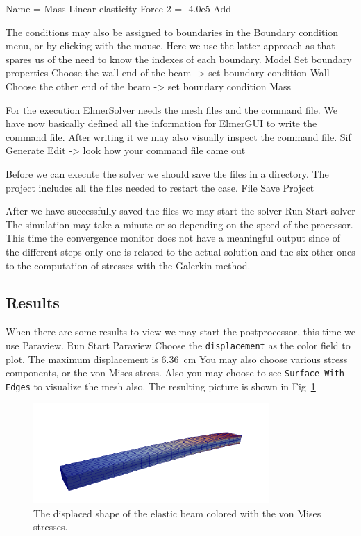     Name = Mass
    Linear elasticity 
      Force 2 = -4.0e5
    Add 
\ttend   

The conditions may also be assigned to boundaries in the Boundary condition menu, or 
by clicking with the mouse. Here we use the latter approach as that spares us of the 
need to know the indexes of each boundary. 
\ttbegin
Model
  Set boundary properties
    Choose the wall end of the beam -> set boundary condition Wall
    Choose the other end of the beam -> set boundary condition Mass
\ttend

For the execution 
ElmerSolver needs the mesh files and the command file. We have now basically defined
all the information for ElmerGUI to write the command file. After writing it we may also visually 
inspect the command file.
\ttbegin
Sif 
  Generate
  Edit -> look how your command file came out  
\ttend

Before we can execute the solver we should save the files in a directory. The project includes
all the files needed to restart the case.
\ttbegin
File 
  Save Project
\ttend

After we have successfully saved the files we may start the solver
\ttbegin
Run
  Start solver
\ttend
The simulation may take a minute or so depending on the 
speed of the processor.
This time the convergence monitor does not have a meaningful output since 
of the different steps only one is related to the actual solution and the six other
ones to the computation of stresses with the Galerkin method.


\subsection*{Results}

When there are some results to view we may start the postprocessor, this time we use Paraview.
\ttbegin
Run
  Start Paraview
\ttend
Choose the \texttt{displacement} as the color field to plot.
The maximum displacement is $6.36$~cm 
You may also choose various stress components, or the von Mises stress.
Also you may choose to see \texttt{Surface With Edges} to visualize the mesh also. 
The resulting picture is shown in Fig~\ref{fig:beam_stresses}
\begin{figure}[h!]
\begin{center}
  \includegraphics[width=0.8\textwidth]{beam_vonMises}
  \caption{The displaced shape of the elastic beam colored with the 
  von Mises stresses.}
  \label{fig:beam_stresses}
\end{center}
\end{figure}

